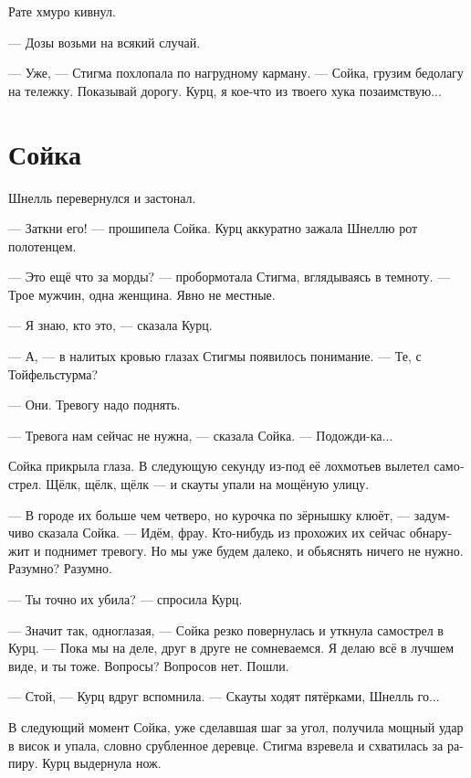 \documentclass[a4paper,12pt,fleqn]{book}\usepackage{polyglossia}\setdefaultlanguage[babelshorthands=true]{russian}\setotherlanguage{english}\defaultfontfeatures{Ligatures=TeX,Mapping=tex-text}\usepackage{xcolor}\newcommand{\ml}[3]{#2}
\begin{document}
Рате хмуро кивнул.

\ml{$0$}
{--- Дозы возьми на всякий случай.}
{``Take your fix for safety.''}

\ml{$0$}
{--- Уже, --- Стигма похлопала по нагрудному карману.}
{``Already have,'' Stigma patted her breast-pocket.}
--- Сойка, грузим бедолагу на тележку.
Показывай дорогу.
Курц, я кое-что из твоего хука позаимствую...

\section{Сойка}

Шнелль перевернулся и застонал.

--- Заткни его! --- прошипела Сойка.
Курц аккуратно зажала Шнеллю рот полотенцем.

--- Это ещё что за морды? --- пробормотала Стигма, вглядываясь в темноту.
--- Трое мужчин, одна женщина.
Явно не местные.

--- Я знаю, кто это, --- сказала Курц.

--- А, --- в налитых кровью глазах Стигмы появилось понимание.
--- Те, с Тойфельстурма?

--- Они.
Тревогу надо поднять.

--- Тревога нам сейчас не нужна, --- сказала Сойка.
--- Подожди-ка...

Сойка прикрыла глаза.
В следующую секунду из-под её лохмотьев вылетел самострел.
Щёлк, щёлк, щёлк --- и скауты упали на мощёную улицу.

--- В городе их больше чем четверо, но курочка по зёрнышку клюёт, --- задумчиво сказала Сойка.
--- Идём, фрау.
Кто-нибудь из прохожих их сейчас обнаружит и поднимет тревогу.
Но мы уже будем далеко, и обьяснять ничего не нужно.
\ml{$0$}
{Разумно?}
{Makes sense?}
\ml{$0$}
{Разумно.}
{Makes sense.''}

--- Ты точно их убила? --- спросила Курц.

--- Значит так, одноглазая, --- Сойка резко повернулась и уткнула самострел в Курц.
--- Пока мы на деле, друг в друге не сомневаемся.
\ml{$0$}
{Я делаю всё в лучшем виде, и ты тоже.}
{I do my best, you do yours.}
\ml{$0$}
{Вопросы?}
{Any questions?}
\ml{$0$}
{Вопросов нет.}
{No questions.''}
Пошли.

--- Стой, --- Курц вдруг вспомнила.
--- Скауты ходят пятёрками, Шнелль го...

В следующий момент Сойка, уже сделавшая шаг за угол, получила мощный удар в висок и упала, словно срубленное деревце.
Стигма взревела и схватилась за рапиру.
Курц выдернула нож.
\end{document}
